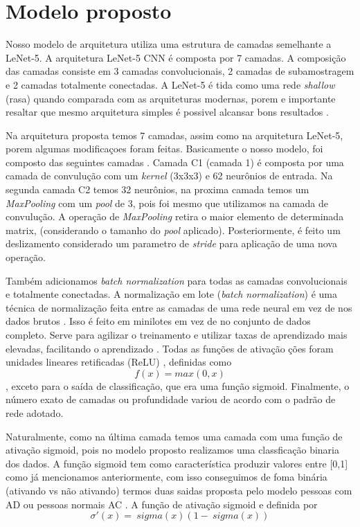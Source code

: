 \documentclass[openright]{UFRGS} %
\begin{document}
\section{Modelo proposto}

Nosso modelo de arquitetura utiliza uma estrutura de camadas  semelhante
a LeNet-5. A arquitetura LeNet-5 CNN é composta por 7 camadas. A composição das camadas consiste em 3 camadas convolucionais, 2 camadas de subamostragem e 2 camadas totalmente conectadas.
 A LeNet-5 é tida como uma rede \textit{shallow} (rasa) quando comparada com as arquiteturas  modernas, porem e importante resaltar que mesmo arquitetura simples é possivel alcansar bons resultados \cite{lecun2015lenet}.

Na arquitetura proposta temos 7 camadas, assim como na arquitetura LeNet-5, porem algumas modificaçoes foram feitas. Basicamente o nosso modelo, foi composto das seguintes camadas
. Camada C1 (camada 1)  é composta por uma camada de convulução com um \textit{kernel} (3x3x3) e 62 neurônios de entrada. Na segunda camada C2 temos
32 neurônios, na proxima camada temos um \textit{MaxPooling} com um \textit{pool} de 3, pois foi mesmo que utilizamos na camada de convulução.
A operação de \textit{MaxPooling} retira o maior elemento de determinada matrix, (considerando o tamanho do \textit{pool} aplicado). Posteriormente, é feito um deslizamento considerado um parametro de \textit{stride} para aplicação de uma nova operação.


Também adicionamos \textit{batch
normalization}  para todas as camadas convolucionais e totalmente conectadas. A normalização em lote  (\textit{batch
normalization})
 é uma técnica de normalização feita entre as camadas de uma rede neural em vez de nos dados brutos . Isso é feito em minilotes em vez de no conjunto de dados completo. Serve para agilizar o treinamento e 
utilizar taxas de aprendizado mais elevadas, facilitando o aprendizado \cite{ioffe2015batch}.
Todas as funções de ativação
ções foram unidades lineares retificadas (ReLU) , definidas como  $$ f (x) = max (0, x)  $$ , exceto para o
saída de classificação, que era uma função sigmoid. Finalmente, o número exato de camadas
ou profundidade variou de acordo com o padrão de rede adotado.


Naturalmente, como na última camada temos uma camada com uma função de ativação sigmoid, pois no modelo proposto realizamos uma classficação binaria dos dados. A função sigmoid tem como característica produzir valores entre [0,1] como já mencionamos anteriormente, com isso conseguimos de foma binária (ativando vs não ativando) termos duas saidas proposta pelo modelo pessoas com AD ou pessoas normais AC . A função de ativação sigmoid e definida por  $$ \sigma '(x) = \ sigma (x) (1 - \ sigma (x)) $$
\end{document}
